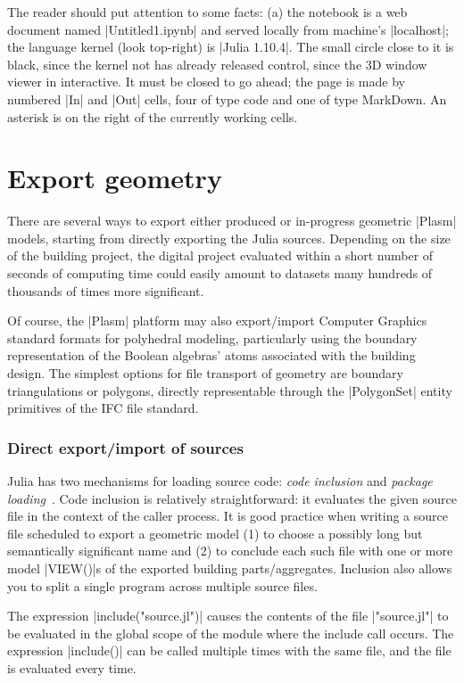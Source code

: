 \begin{coding}
The reader should put attention to some facts: (a) the notebook is a web document named |Untitled1.ipynb| and served locally from machine’s |localhost|; the language kernel (look top-right) is |Julia 1.10.4|. The small circle close to it is black, since the kernel not has already released control, since the 3D window viewer in interactive. It must be closed to go ahead; the page is made by numbered |In| and |Out| cells, four of type code and one of type MarkDown. An asterisk is on the right of the currently working cells.

\section{Export geometry}\label{sect:4-6}

There are several ways to export either produced or in-progress geometric |Plasm| models, starting from directly exporting the Julia sources. Depending on the size of the building project, the digital project evaluated within a short number of seconds of computing time could easily amount to datasets many hundreds of thousands of times more significant. 

Of course, the |Plasm| platform may also export/import Computer Graphics standard formats for polyhedral modeling, particularly using the boundary representation of the Boolean algebras’ atoms associated with the building design. The simplest options for file transport of geometry are boundary triangulations or polygons, directly representable through the |PolygonSet| entity primitives of the IFC file standard.

\subsubsection*{Direct export/import of sources}\label{sect:4-6-1}

Julia has two mechanisms for loading source code: \emph{code inclusion} and \emph{package loading}~\cite{}.
Code inclusion is relatively straightforward: it evaluates the given source file in the context of the caller process. It is good practice when writing a source file scheduled to export a geometric model (1) to choose a possibly long but semantically significant name and (2) to conclude each such file with one or more model |VIEW()|s of the exported building parts/aggregates. Inclusion also allows you to split a single program across multiple source files.

The expression |include("source.jl")| causes the contents of the file |"source.jl"| to be evaluated in the global scope of the module where the include call occurs. The expression |include()| can be called multiple times with the same file, and the file is evaluated every time. 


\end{coding}
